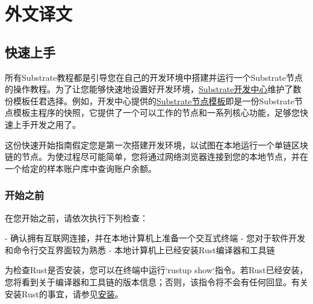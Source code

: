 %
%
%
%
%
%


\chapter{外文译文}

\section{快速上手}

所有Substrate教程都是引导您在自己的开发环境中搭建并运行一个Substrate节点的操作教程。为了让您能够快速地设置好开发环境，\href{https://github.com/substrate-developer-hub/}{Substrate开发中心}维护了数份模板任君选择。例如，开发中心提供的\href{https://github.com/substrate-developer-hub/substrate-node-template/tags/}{Substrate节点模板}即是一份Substrate节点模板主程序的快照，它提供了一个可以工作的节点和一系列核心功能，足够您快速上手开发之用了。

这份快速开始指南假定您是第一次搭建开发环境，以试图在本地运行一个单链区块链的节点。为使过程尽可能简单，您将通过网络浏览器连接到您的本地节点，并在一个给定的样本账户库中查询账户余额。

\subsection{开始之前}


在您开始之前，请依次执行下列检查：

- 确认拥有互联网连接，并在本地计算机上准备一个交互式终端
- 您对于软件开发和命令行交互界面较为熟悉
- 本地计算机上已经安装Rust编译器和工具链

为检查Rust是否安装，您可以在终端中运行`rustup show`指令。若Rust已经安装，您将看到关于编译器和工具链的版本信息；否则，该指令将不会有任何回显。有关安装Rust的事宜，请参见\href{https://docs.substrate.io/install/}{安装}。

